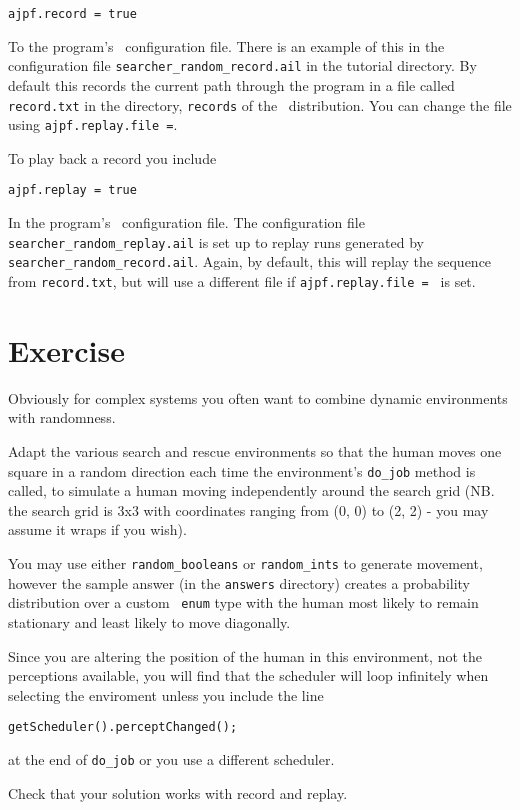 \documentclass[a4]{article}
\begin{document}
\begin{verbatim}
ajpf.record = true
\end{verbatim}

\begin{sloppypar}
To the program's \ail\ configuration file.  There is an example of this in the configuration file \texttt{searcher\_random\_record.ail} in the tutorial directory.  By default this records the current path through the program in a file called \texttt{record.txt} in the directory, \texttt{records} of the \mcapl\ distribution.  You can change the file using \texttt{ajpf.replay.file =}.  
\end{sloppypar}

To play back a record you include
\begin{verbatim}
ajpf.replay = true
\end{verbatim}
\begin{sloppypar}
In the program's \ail\ configuration file.  The configuration file \texttt{searcher\_random\_replay.ail} is set up to replay runs generated by \texttt{searcher\_random\_record.ail}.  Again, by default, this will replay the sequence from \texttt{record.txt}, but will use a different file if \texttt{ajpf.replay.file = } is set.  
\end{sloppypar}

\section{Exercise}

Obviously for complex systems you often want to combine dynamic environments with randomness.  

Adapt the various search and rescue environments so that the human moves one square in a random direction each time the environment's \texttt{do\_job} method is called, to simulate a human moving independently around the search grid (NB. the search grid is 3x3 with coordinates ranging from (0, 0) to (2, 2) - you may assume it wraps if you wish).  

You may use either \texttt{random\_booleans} or \texttt{random\_ints} to generate movement, however the sample answer (in the \texttt{answers} directory) creates a probability distribution over a custom \java\ \texttt{enum} type with the human most likely to remain stationary and least likely to move diagonally.

Since you are altering the position of the human in this environment, not the perceptions available, you will find that the scheduler will loop infinitely when selecting the enviroment unless you include the line
\begin{verbatim}
getScheduler().perceptChanged();
\end{verbatim}
at the end of \texttt{do\_job} or you use a different scheduler.

Check that your solution works with record and replay.
\end{document}
